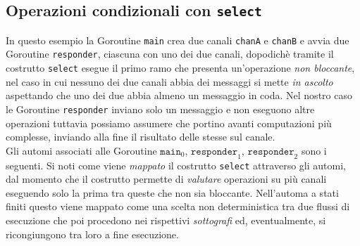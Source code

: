 \begin{figure}[h!]
    \centering
\end{figure}


\subsection{Operazioni condizionali con \texttt{select}}
In questo esempio la Goroutine \texttt{main} crea due canali \texttt{chanA} e \texttt{chanB} e avvia due Goroutine \texttt{responder}, ciascuna con uno dei due canali, dopodichè tramite il costrutto \texttt{select} esegue il primo ramo che presenta un'operazione \emph{non bloccante}, nel caso in cui nessuno dei due canali abbia dei messaggi si mette \emph{in ascolto} aspettando che uno dei due abbia almeno un messaggio in coda. Nel nostro caso le Goroutine \texttt{responder} inviano solo un messaggio e non eseguono altre operazioni tuttavia possiamo assumere che portino avanti computazioni più complesse, inviando alla fine il risultato delle stesse sul canale.\\

Gli automi associati alle Goroutine $\texttt{main}_0$, $\texttt{responder}_1$, $\texttt{responder}_2$ sono i seguenti. Si noti come viene \emph{mappato} il costrutto \texttt{select} attraverso gli automi, dal momento che il costrutto permette di \emph{valutare} operazioni su più canali eseguendo solo la prima tra queste che non sia bloccante. Nell'automa a stati finiti questo viene mappato come una scelta non deterministica tra due flussi di esecuzione che poi procedono nei rispettivi \emph{sottografi} ed, eventualmente, si ricongiungono tra loro a fine esecuzione.\bigskip \\
